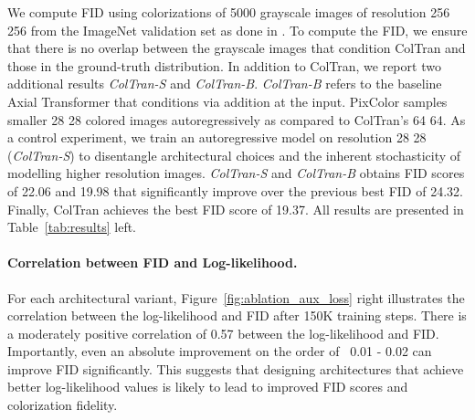 \documentclass{article} \usepackage{iclr2021_conference,times}
\begin{document}
We compute FID using colorizations of 5000 grayscale images of resolution 256  256 from the ImageNet validation set as done in \citep{ardizzone2019guided}. To compute the FID, we ensure that there is no overlap between the grayscale images that condition ColTran and those in the ground-truth distribution. In addition to ColTran, we report two additional results \textit{ColTran-S} and \textit{ColTran-B}. \textit{ColTran-B} refers to the baseline Axial Transformer that conditions via addition at the input. PixColor samples smaller 28  28 colored images autoregressively as compared to ColTran's 64  64. As a control experiment, we train an autoregressive model on resolution 28  28 (\textit{ColTran-S}) to disentangle architectural choices and the inherent stochasticity of modelling higher resolution images. \textit{ColTran-S} and \textit{ColTran-B} obtains FID scores of 22.06 and 19.98 that significantly improve over the previous best FID of 24.32. Finally, ColTran achieves the best FID score of 19.37. All results are presented in Table~\ref{tab:results} left.

\paragraph{Correlation between FID and Log-likelihood.} For each architectural variant, Figure~\ref{fig:ablation_aux_loss} right illustrates the correlation between the log-likelihood and FID after 150K training steps. There is a moderately positive correlation of 0.57 between the log-likelihood and FID. Importantly, even an absolute improvement on the order of ~0.01 - 0.02 can improve FID significantly. This suggests that designing architectures that achieve better log-likelihood values is likely to lead to improved FID scores and colorization fidelity.
\end{document}
